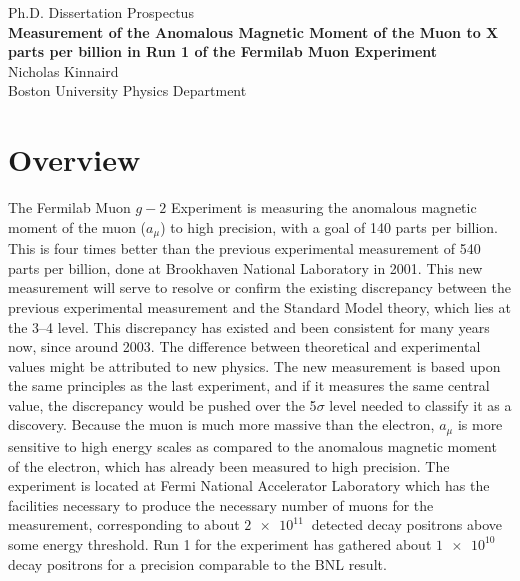 \documentclass[12pt,letterpaper]{article}
\def\gmtwo{$g-2$\xspace}
\def\amu{$a_{\mu}$\xspace}
\begin{document}
\begin{center}
\Large{Ph.D. Dissertation Prospectus} \\\vspace{5mm}
\textbf{\Large{Measurement of the Anomalous Magnetic Moment of the Muon to X parts per billion in Run 1 of the Fermilab Muon  Experiment}} \\\vspace{5mm}
\large{Nicholas Kinnaird} \\\vspace{5mm}
\large{Boston University Physics Department} \\\vspace{5mm}
\end{center}


\section*{Overview}


The Fermilab Muon \gmtwo Experiment is measuring the anomalous magnetic moment of the muon (\amu) to high precision, with a goal of 140 parts per billion. This is four times better than the previous experimental measurement of 540 parts per billion, done at Brookhaven National Laboratory in 2001. This new measurement will serve to resolve or confirm the existing discrepancy between the previous experimental measurement and the Standard Model theory, which lies at the \SIrange{3}{4}{\sigma} level. This discrepancy has existed and been consistent for many years now, since around 2003. The difference between theoretical and experimental values might be attributed to new physics. The new measurement is based upon the same principles as the last experiment, and if it measures the same central value, the discrepancy would be pushed over the 5$\sigma$ level needed to classify it as a discovery. Because the muon is much more massive than the electron, \amu is more sensitive to high energy scales as compared to the anomalous magnetic moment of the electron, which has already been measured to high precision. The experiment is located at Fermi National Accelerator Laboratory which has the facilities necessary to produce the necessary number of muons for the measurement, corresponding to about $\SI{2e11}{}$ detected decay positrons above some energy threshold. Run 1 for the experiment has gathered about $\SI{1e10}{}$ decay positrons for a precision comparable to the BNL result.
\end{document}
